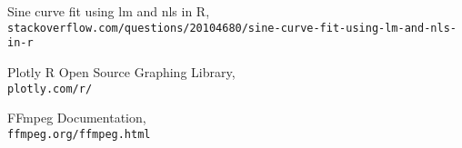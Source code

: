 \documentclass[letterpaper,12pt]{article}
\begin{document}
\renewcommand\refname{Bibliografia}
\begin{thebibliography}{99}


Sine curve fit using lm and nls in R,
\\\texttt{stackoverflow.com/questions/20104680/sine-curve-fit-using-lm-and-nls-in-r}

Plotly R Open Source Graphing Library,
\\\texttt{plotly.com/r/}

FFmpeg Documentation,
\\\texttt{ffmpeg.org/ffmpeg.html}


\end{thebibliography}
\end{document}
